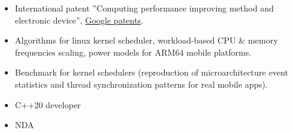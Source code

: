 
    \begin{itemize}
        \item International patent ''Computing performance improving method and electronic device'',
            \href{https://patents.google.com/patent/WO2025029163A1}{Google patents}.
        \smallskip
        \item Algorithms for linux kernel scheduler, workload-based CPU \& memory frequencies
            scaling, power models for ARM64 mobile platforms.
        \item Benchmark for kernel schedulers (reproduction of microarchitecture event statistics and thread
            synchronization patterns for real mobile apps).
    \end{itemize}

    \begin{itemize}
        \item C++20 developer
        \item NDA
    \end{itemize}

    \smallskip

